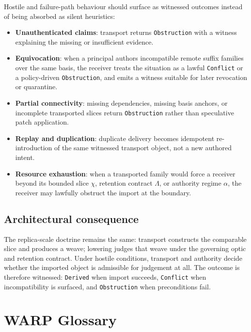 \documentclass{aion}
\begin{document}
Hostile and failure-path behaviour should surface as witnessed outcomes instead
of being absorbed as silent heuristics:
\begin{itemize}[leftmargin=*]
	\item \textbf{Unauthenticated claims}: transport returns \texttt{Obstruction}
	      with a witness explaining the missing or insufficient evidence.
	\item \textbf{Equivocation}: when a principal authors incompatible remote
	      suffix families over the same basis, the receiver treats the situation
	      as a lawful \texttt{Conflict} or a policy-driven \texttt{Obstruction},
	      and emits a witness suitable for later revocation or quarantine.
	\item \textbf{Partial connectivity}: missing dependencies, missing basis
	      anchors, or incomplete transported slices return \texttt{Obstruction}
	      rather than speculative patch application.
	\item \textbf{Replay and duplication}: duplicate delivery becomes idempotent
	      re-introduction of the same witnessed transport object, not a new
	      authored intent.
	\item \textbf{Resource exhaustion}: when a transported family would force a
	      receiver beyond its bounded slice \(\chi\), retention contract
	      \(\Lambda\), or authority regime \(\alpha\), the receiver may lawfully
	      obstruct the import at the boundary.
\end{itemize}

\subsection{Architectural consequence}

The replica-scale doctrine remains the same: transport constructs the comparable
slice and produces a weave; lowering judges that weave under the governing optic
and retention contract. Under hostile conditions, transport and authority decide
whether the imported object is admissible for judgement at all. The outcome is
therefore witnessed: \texttt{Derived} when import succeeds, \texttt{Conflict}
when incompatibility is surfaced, and \texttt{Obstruction} when preconditions
fail.

\clearpage
\section{WARP Glossary}
\label{sec:glossary}
\end{document}

